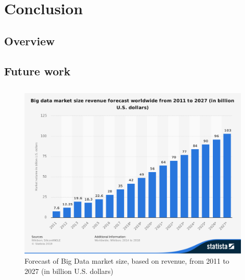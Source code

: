 \documentclass[bsc,frontabs,twoside,singlespacing,parskip,deptreport,hidel]{infthesis}     %
\begin{document}
\chapter{Conclusion}
\label{chap:conclusion}
\section{Overview}
\section{Future work}





\begin{appendices}
  \chapter[]{}
  \begin{figure}
    \includegraphics[scale=0.5]{revenue_forecast_statista}
    \caption{Forecast of Big Data market size, based on revenue, from 2011 to 2027 (in billion U.S. dollars) \cite{statista_market_forecast:online}}
    \label{fig:revenue_forecast}
  \end{figure}
  \end{appendices}
\end{document}
